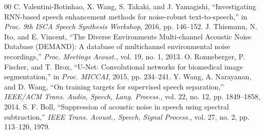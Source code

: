 \documentclass[conference]{IEEEtran}
\begin{document}
\begin{thebibliography}{00}
 C. Valentini-Botinhao, X. Wang, S. Takaki, and J. Yamagishi, ``Investigating RNN-based speech enhancement methods for noise-robust text-to-speech,'' in \textit{Proc. 9th ISCA Speech Synthesis Workshop}, 2016, pp. 146--152.
 J. Thiemann, N. Ito, and E. Vincent, ``The Diverse Environments Multi-channel Acoustic Noise Database (DEMAND): A database of multichannel environmental noise recordings,'' \textit{Proc. Meetings Acoust.}, vol. 19, no. 1, 2013.
 O. Ronneberger, P. Fischer, and T. Brox, ``U-Net: Convolutional networks for biomedical image segmentation,'' in \textit{Proc. MICCAI}, 2015, pp. 234--241.
 Y. Wang, A. Narayanan, and D. Wang, ``On training targets for supervised speech separation,'' \textit{IEEE/ACM Trans. Audio, Speech, Lang. Process.}, vol. 22, no. 12, pp. 1849--1858, 2014.
 S. F. Boll, ``Suppression of acoustic noise in speech using spectral subtraction,'' \textit{IEEE Trans. Acoust., Speech, Signal Process.}, vol. 27, no. 2, pp. 113--120, 1979.
\end{thebibliography}
\end{document}
